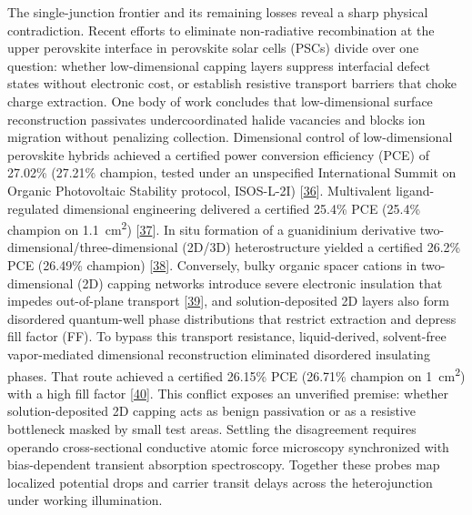 \documentclass[
  11pt,
]{article}
\begin{document}
The single-junction frontier and its remaining losses reveal a sharp
physical contradiction. Recent efforts to eliminate non-radiative
recombination at the upper perovskite interface in perovskite solar
cells (PSCs) divide over one question: whether low-dimensional capping
layers suppress interfacial defect states without electronic cost, or
establish resistive transport barriers that choke charge extraction. One
body of work concludes that low-dimensional surface reconstruction
passivates undercoordinated halide vacancies and blocks ion migration
without penalizing collection. Dimensional control of low-dimensional
perovskite hybrids achieved a certified power conversion efficiency
(PCE) of 27.02\% (27.21\% champion, tested under an unspecified
International Summit on Organic Photovoltaic Stability protocol,
ISOS-L-2I) {[}\href{https://doi.org/10.1038/s41467-026-71845-7}{36}{]}.
Multivalent ligand-regulated dimensional engineering delivered a
certified 25.4\% PCE (25.4\% champion on
\qty{1.1}{\centi\meter\squared})
{[}\href{https://doi.org/10.1126/science.aea0656}{37}{]}. In situ
formation of a guanidinium derivative two-dimensional/three-dimensional
(2D/3D) heterostructure yielded a certified 26.2\% PCE (26.49\%
champion) {[}\href{https://doi.org/10.1002/anie.8890696}{38}{]}.
Conversely, bulky organic spacer cations in two-dimensional (2D) capping
networks introduce severe electronic insulation that impedes
out-of-plane transport
{[}\href{https://doi.org/10.1002/anie.4293157}{39}{]}, and
solution-deposited 2D layers also form disordered quantum-well phase
distributions that restrict extraction and depress fill factor (FF). To
bypass this transport resistance, liquid-derived, solvent-free
vapor-mediated dimensional reconstruction eliminated disordered
insulating phases. That route achieved a certified 26.15\% PCE (26.71\%
champion on \qty{1}{\centi\meter\squared}) with a high fill factor
{[}\href{https://doi.org/10.1038/s41467-026-72790-1}{40}{]}. This
conflict exposes an unverified premise: whether solution-deposited 2D
capping acts as benign passivation or as a resistive bottleneck masked
by small test areas. Settling the disagreement requires operando
cross-sectional conductive atomic force microscopy synchronized with
bias-dependent transient absorption spectroscopy. Together these probes
map localized potential drops and carrier transit delays across the
heterojunction under working illumination.
\end{document}
